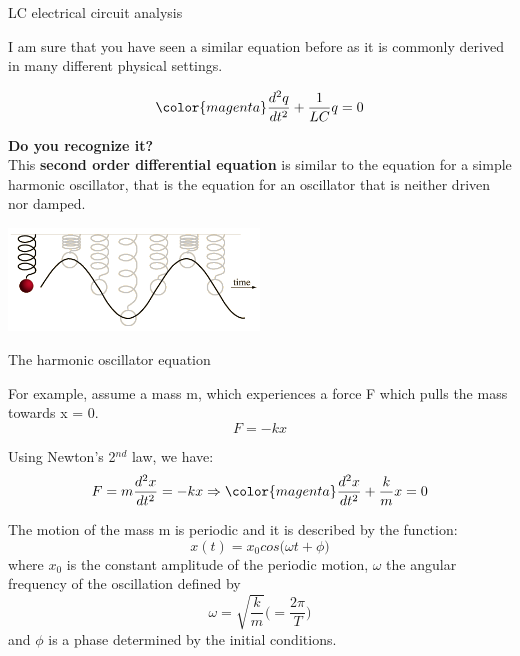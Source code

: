 \begin{frame}{LC electrical circuit analysis}

I am sure that you have seen a similar equation before as it is commonly derived in many
different physical settings.

\begin{equation*}
  {\color{magenta}
       \frac{d^2q}{dt^2} + \frac{1}{LC} q = 0
  }
\end{equation*}

{\bf Do you recognize it?}\\

\vspace{0.2cm}
This {\bf second order differential equation} is similar to the equation for a simple
harmonic oscillator, that is the equation for an oscillator that is neither driven nor damped.

\begin{center}
  \includegraphics[width=0.50\textwidth]{./images/schematics/harmonic_oscillator.png}\\
\end{center}


\end{frame}

%
%
%

\begin{frame}{The harmonic oscillator equation}

For example, assume a mass m, which experiences a force F which pulls the mass towards x = 0.
\begin{equation*}
   F = -kx
\end{equation*}

Using Newton's 2$^{nd}$ law, we have:
\begin{equation*}
   F = m \frac{d^2x}{dt^2} = -kx \Rightarrow
   {\color{magenta}
       \frac{d^2x}{dt^2} + \frac{k}{m} x = 0
   }
\end{equation*}

The motion of the mass m is periodic and it is described by the function:
\begin{equation*}
   x(t) = x_0 cos\Big( \omega t + \phi \Big)
\end{equation*}
where $x_0$ is the constant amplitude of the periodic motion,
$\omega$ the angular frequency of the oscillation defined by
\begin{equation*}
   \omega = \sqrt{\frac{k}{m}} \Big( = \frac{2\pi}{T} \Big)
\end{equation*}
and $\phi$ is a phase determined by the initial conditions.

\end{frame}


